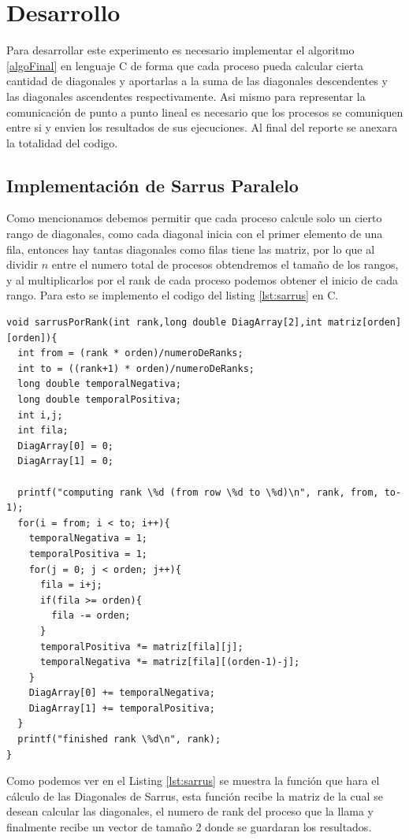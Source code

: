 \documentclass[10pt]{IEEEtran}
\begin{document}
\section{Desarrollo}
Para desarrollar este experimento es necesario implementar el algoritmo \ref{algoFinal} en lenguaje C de forma que cada proceso pueda calcular cierta cantidad de diagonales y aportarlas a la suma de las diagonales descendentes y las diagonales ascendentes respectivamente. Asi mismo para representar la comunicación de punto a punto lineal es necesario que los procesos se comuniquen entre si y envien los resultados de sus ejecuciones. Al final del reporte se anexara la totalidad del codigo.

\subsection{Implementación de Sarrus Paralelo}
Como mencionamos debemos permitir que cada proceso calcule solo un cierto rango de diagonales, como cada diagonal inicia con el primer elemento de una fila, entonces hay tantas diagonales como filas tiene las matriz, por lo que al dividir $n$ entre el numero total de procesos obtendremos el tamaño de los rangos, y al multiplicarlos por el rank de cada proceso podemos obtener el inicio de cada rango. Para esto se implemento el codigo del listing \ref{lst:sarrus} en C.

\begin{lstlisting}[caption={Implementacion de Sarrus Paralelo},label={lst:sarrus}]
void sarrusPorRank(int rank,long double DiagArray[2],int matriz[orden][orden]){
  int from = (rank * orden)/numeroDeRanks;
  int to = ((rank+1) * orden)/numeroDeRanks;
  long double temporalNegativa;
  long double temporalPositiva;
  int i,j;
  int fila;
  DiagArray[0] = 0;
  DiagArray[1] = 0;

  printf("computing rank \%d (from row \%d to \%d)\n", rank, from, to-1);
  for(i = from; i < to; i++){
    temporalNegativa = 1;
    temporalPositiva = 1;
    for(j = 0; j < orden; j++){
      fila = i+j;
      if(fila >= orden){
        fila -= orden;
      }
      temporalPositiva *= matriz[fila][j];
      temporalNegativa *= matriz[fila][(orden-1)-j];
    }
    DiagArray[0] += temporalNegativa;
    DiagArray[1] += temporalPositiva;
  }
  printf("finished rank \%d\n", rank);
}
\end{lstlisting}

Como podemos ver en el Listing \ref{lst:sarrus} se muestra la función que hara el cálculo de las Diagonales de Sarrus, esta función recibe la matriz de la cual se desean calcular las diagonales, el numero de rank del proceso que la llama y finalmente recibe un vector de tamaño 2 donde se guardaran los resultados.
\end{document}
